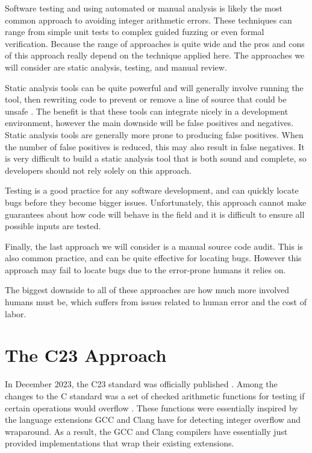 Software testing and using automated or manual analysis is likely the most common approach to avoiding integer arithmetic errors. These techniques can range from simple unit tests to complex guided fuzzing or even formal verification. Because the range of approaches is quite wide and the pros and cons of this approach really depend on the technique applied here. The approaches we will consider are static analysis, testing, and manual review.

Static analysis tools can be quite powerful and will generally involve running the tool, then rewriting code to prevent or remove a line of source that could be unsafe \cite{secure_coding}. The benefit is that these tools can integrate nicely in a development environment, however the main downside will be false positives and negatives. Static analysis tools are generally more prone to producing false positives. When the number of false positives is reduced, this may also result in false negatives. It is very difficult to build a static analysis tool that is both sound and complete, so developers should not rely solely on this approach.

Testing is a good practice for any software development, and can quickly locate bugs before they become bigger issues. Unfortunately, this approach cannot make guarantees about how code will behave in the field and it is difficult to ensure all possible inputs are tested.

Finally, the last approach we will consider is a manual source code audit. This is also common practice, and can be quite effective for locating bugs. However this approach may fail to locate bugs due to the error-prone humans it relies on.

The biggest downside to all of these approaches are how much more involved humans must be, which suffers from issues related to human error and the cost of labor.

\section{The C23 Approach}

In December 2023, the C23 standard was officially published \cite{c_standard}. Among the changes to the C standard was a set of checked arithmetic functions for testing if certain operations would overflow \cite{ckd_arith}. These functions were essentially inspired by the language extensions GCC and Clang have for detecting integer overflow and wraparound. As a result, the GCC and Clang compilers have essentially just provided implementations that wrap their existing extensions.

